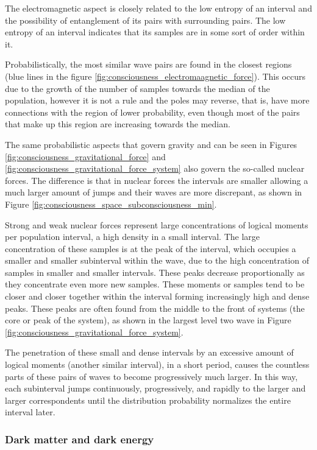 The electromagnetic aspect is closely related to the low entropy of an interval and the possibility of entanglement of its pairs with surrounding pairs. The low entropy of an interval indicates that its samples are in some sort of order within it.

Probabilistically, the most similar wave pairs are found in the closest regions (blue lines in the figure \ref{fig:consciousness_electromaagnetic_force}). This occurs due to the growth of the number of samples towards the median of the population, however it is not a rule and the poles may reverse, that is, have more connections with the region of lower probability, even though most of the pairs that make up this region are increasing towards the median.

The same probabilistic aspects that govern gravity and can be seen in Figures \ref{fig:consciousness_gravitational_force} and \ref{fig:consciousness_gravitational_force_system} also govern the so-called nuclear forces. The difference is that in nuclear forces the intervals are smaller allowing a much larger amount of jumps and their waves are more discrepant, as shown in Figure \ref{fig:consciousness_space_subconsciousness_min}.

Strong and weak nuclear forces represent large concentrations of logical moments per population interval, a high density in a small interval. The large concentration of these samples is at the peak of the interval, which occupies a smaller and smaller subinterval within the wave, due to the high concentration of samples in smaller and smaller intervals. These peaks decrease proportionally as they concentrate even more new samples. These moments or samples tend to be closer and closer together within the interval forming increasingly high and dense peaks. These peaks are often found from the middle to the front of systems (the core or peak of the system), as shown in the largest level two wave in Figure \ref{fig:consciousness_gravitational_force_system}.

The penetration of these small and dense intervals by an excessive amount of logical moments (another similar interval), in a short period, causes the countless parts of these pairs of waves to become progressively much larger. In this way, each subinterval jumps continuously, progressively, and rapidly to the larger and larger correspondents until the distribution probability normalizes the entire interval later.

\subsubsection{Dark matter and dark energy}


